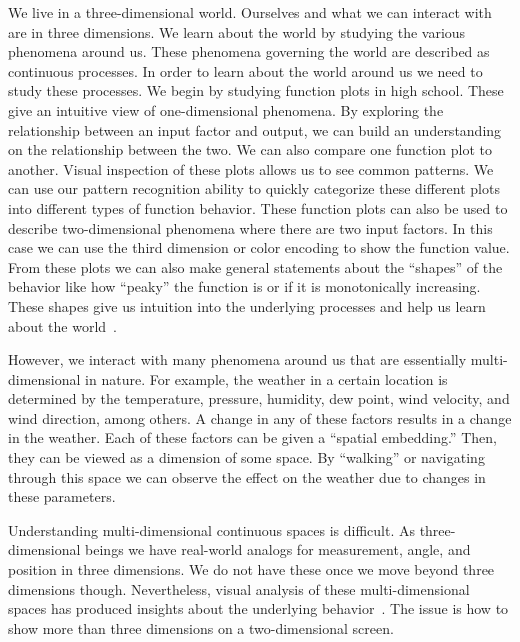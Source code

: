 
We live in a three-dimensional world. 
Ourselves and what we can interact with are in three dimensions.
We learn about the world by studying the various phenomena around us.
These phenomena governing the world are described as continuous processes.
In order to learn about the world around us we need to study these processes.
We begin by studying function plots in high 
school. These give an intuitive view of one-dimensional 
phenomena. 
By exploring the relationship
between an input factor
and output,
we can build an understanding on the relationship between the two.
We can also compare one function plot to another. Visual inspection of these plots
allows us to see common patterns. We can use our pattern recognition ability
to quickly categorize these different plots into different types of function
behavior. These function plots can also be used to describe two-dimensional
phenomena where there are two input factors. In this case we can use the third
dimension or color encoding to show the function value. 
From these plots we can also make general statements about the ``shapes'' of
the behavior like how ``peaky'' the function is or if it is monotonically
increasing. These shapes give us intuition into the underlying processes and
help us learn about the world~\cite{Palmer:1999}.

However, we interact with many phenomena around us that are essentially
multi-dimensional in nature. For example, the weather in a certain location is
determined by the temperature, pressure, humidity, dew point, wind velocity,
and wind direction, among others. A change in any of these factors results in a
change in the weather. Each of these factors can be given a ``spatial
embedding.'' Then, they can be viewed as a dimension of some space.  By
``walking'' or navigating through this space we can observe the effect on the
weather due to changes in these parameters. 

Understanding multi-dimensional continuous spaces is difficult. As
three-dimensional beings we have real-world analogs for measurement,
angle, and position in three dimensions. We do not have these once we
move beyond three dimensions though. Nevertheless, visual analysis of
these multi-dimensional spaces has produced insights about the
underlying behavior~\cite{Sedlmair:2014}. The issue is how to show more
than three dimensions on a two-dimensional screen. 

